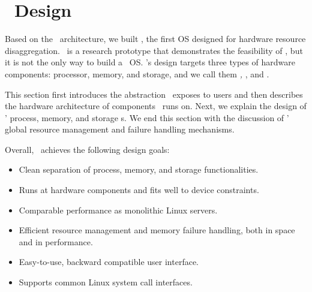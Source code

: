 \documentclass[10pt,times,twocolumn]{z2-article}
\begin{document}
{{{{{{{\fi
\section{\lego\ Design}
\label{sec:design}

Based on the \splitkernel\ architecture,
we built {\em \lego}, the first OS designed for hardware resource disaggregation.
\lego\ is a research prototype that demonstrates the feasibility of \splitkernel,
but it is not the only way to build a \splitkernel\ OS.
\lego's design targets three types of hardware components:
processor, memory, and storage,
and we call them {\em \pcomponent, \mcomponent}, and {\em \scomponent}.

This section first introduces the abstraction \lego\ exposes to users
and then describes the hardware architecture of components \lego\ runs on.
Next, we explain the design of \lego' process, memory, and storage \microos{}s.
We end this section with the discussion of \lego' global resource management and failure handling mechanisms.

Overall, \lego\ achieves the following design goals:

\begin{itemize}

\vspace{-0.1in}

\item Clean separation of process, memory, and storage functionalities.
\vspace{-0.1in}

\item Runs at hardware components and fits well to device constraints.
\vspace{-0.1in}

\item Comparable performance as monolithic Linux servers.
\vspace{-0.1in}

\item Efficient resource management and memory failure handling, both in space and in performance. %
\vspace{-0.1in}

\item Easy-to-use, backward compatible user interface.
\vspace{-0.1in}

\item Supports common Linux system call interfaces.
\vspace{-0.1in}


\end{itemize}}}}}}}}
\end{document}
